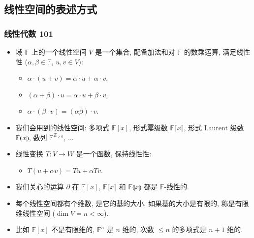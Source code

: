 \documentclass{ctexbeamer}
\newcommand{\bbF}{\mathbb F}
\newcommand{\bbZ}{\mathbb Z}
\begin{document}
\subsection{线性空间的表述方式}

\begin{frame}
  \frametitle{线性代数 101}

  \begin{itemize}
    \item 域 $\bbF$ 上的一个线性空间 $V$ 是一个集合, 配备加法和对 $\bbF$ 的数乘运算, 满足线性性
    ($\alpha, \beta \in \bbF$, $u, v \in V$):
    \begin{itemize}
      \item $\alpha \cdot (u + v) = \alpha \cdot u + \alpha \cdot v$,
      \item $(\alpha + \beta) \cdot u = \alpha \cdot u + \beta \cdot v$,
      \item $\alpha \cdot (\beta \cdot v) = (\alpha \beta) \cdot v$.
    \end{itemize}
    \item 我们会用到的线性空间: 多项式 $\bbF[x]$, 形式幂级数 $\bbF \llbracket x \rrbracket$,
    形式 Laurent 级数 $\bbF \llparenthesis x \rrparenthesis$, 数列 $\bbF^{\bbZ_{\geq 0}}$, ...
    \item 线性变换 $T \colon V \to W$ 是一个函数, 保持线性性:
    \begin{itemize}
      \item $T(u + \alpha v) = Tu + \alpha Tv$.
    \end{itemize}
    \item 我们关心的运算 $\partial$ 在 $\bbF[x]$, $\bbF \llbracket x \rrbracket$ 和 $\bbF \llparenthesis x \rrparenthesis$
    都是 $\bbF$-线性的.
    \item 每个线性空间都有个维数, 是它的基的大小, 如果基的大小是有限的, 称是有限维线性空间 ($\dim V = n < \infty$).
    \item 比如 $\bbF[x]$ 不是有限维的, $\bbF^n$ 是 $n$ 维的, 次数 $\leq n$ 的多项式是 $n+1$ 维的.
  \end{itemize}

\end{frame}
\end{document}
